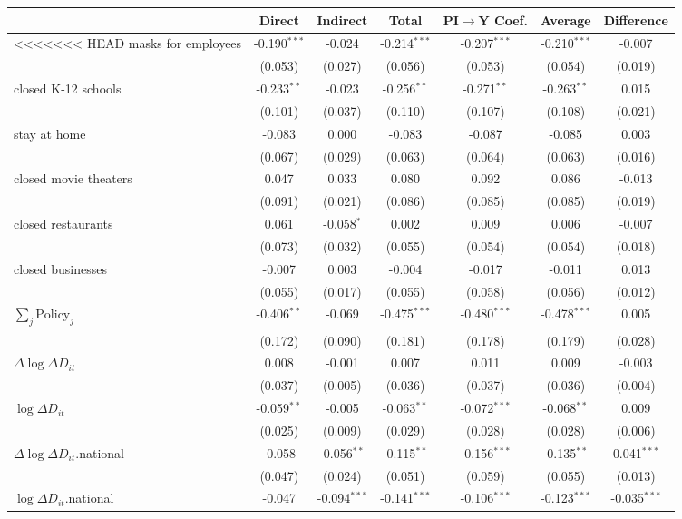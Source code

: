 
\begin{tabular}{lccccc|>{}c}
\toprule
  & Direct & Indirect & Total & PI$\to$Y Coef. & Average & Difference\\
\midrule
<<<<<<< HEAD
masks for employees & -0.190$^{***}$ & -0.024 & -0.214$^{***}$ & -0.207$^{***}$ & -0.210$^{***}$ & -0.007\\
 & (0.053) & (0.027) & (0.056) & (0.053) & (0.054) & (0.019)\\
closed K-12 schools & -0.233$^{**}$ & -0.023 & -0.256$^{**}$ & -0.271$^{**}$ & -0.263$^{**}$ & 0.015\\
 & (0.101) & (0.037) & (0.110) & (0.107) & (0.108) & (0.021)\\
stay at home & -0.083 & 0.000 & -0.083 & -0.087 & -0.085 & 0.003\\
 & (0.067) & (0.029) & (0.063) & (0.064) & (0.063) & (0.016)\\
closed movie theaters & 0.047 & 0.033 & 0.080 & 0.092 & 0.086 & -0.013\\
 & (0.091) & (0.021) & (0.086) & (0.085) & (0.085) & (0.019)\\
closed restaurants & 0.061 & -0.058$^{*}$ & 0.002 & 0.009 & 0.006 & -0.007\\
 & (0.073) & (0.032) & (0.055) & (0.054) & (0.054) & (0.018)\\
closed businesses & -0.007 & 0.003 & -0.004 & -0.017 & -0.011 & 0.013\\
 & (0.055) & (0.017) & (0.055) & (0.058) & (0.056) & (0.012)\\
$\sum_j \mathrm{Policy}_j$ & -0.406$^{**}$ & -0.069 & -0.475$^{***}$ & -0.480$^{***}$ & -0.478$^{***}$ & 0.005\\
 & (0.172) & (0.090) & (0.181) & (0.178) & (0.179) & (0.028)\\
$\Delta \log \Delta D_{it}$ & 0.008 & -0.001 & 0.007 & 0.011 & 0.009 & -0.003\\
 & (0.037) & (0.005) & (0.036) & (0.037) & (0.036) & (0.004)\\
$\log \Delta D_{it}$ & -0.059$^{**}$ & -0.005 & -0.063$^{**}$ & -0.072$^{***}$ & -0.068$^{**}$ & 0.009\\
 & (0.025) & (0.009) & (0.029) & (0.028) & (0.028) & (0.006)\\
$\Delta \log \Delta D_{it}$.national & -0.058 & -0.056$^{**}$ & -0.115$^{**}$ & -0.156$^{***}$ & -0.135$^{**}$ & 0.041$^{***}$\\
 & (0.047) & (0.024) & (0.051) & (0.059) & (0.055) & (0.013)\\
$\log \Delta D_{it}$.national & -0.047 & -0.094$^{***}$ & -0.141$^{***}$ & -0.106$^{***}$ & -0.123$^{***}$ & -0.035$^{***}$\\

\end{tabular}
